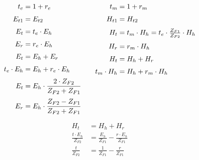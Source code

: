 \vspace{0.2cm}
\begin{equation*}
	\setlength{\jot}{6pt}
	\begin{aligned}[t]
		t_e            & = 1+ r_e                                           \\
		E_{t1}         & =E_{t2}                                            \\
		E_t            & = t_e \cdot E_h                                    \\
		E_r            & = r_e \cdot E_h                                    \\
		E_t            & = E_h + E_r                                        \\
		t_e\cdot E_{h} & = E_{h} + r_e\cdot  E_{h}                          \\
		E_t            & = E_h \cdot \frac{2 \cdot Z_{F2}}{Z_{F2} + Z_{F1}} \\
		E_r            & = E_h \cdot \frac{Z_{F2}-Z_{F1}}{Z_{F2}+Z_{F1}}
	\end{aligned}
	\qquad
	\begin{aligned}[t]
		t_m            & = 1+ r_m                                                      \\
		H_{t1}         & = H_{t2}                                                      \\
		H_t            & = t_m \cdot H_h  = t_e \cdot \tfrac{Z_{F1}}{Z_{F2}} \cdot H_h \\
		H_r            & = r_m \cdot H_h                                               \\
		H_t            & = H_h + H_r                                                   \\
		t_m\cdot H_{h} & = H_{h} + r_m\cdot  H_{h}                                     \\
	\end{aligned}
\end{equation*}

\begin{align*}
	H_t                         & = H_h + H_r                                          \\
	\frac{t\cdot E_{h}}{Z_{F2}} & = \frac{E_{h}}{Z_{F1}} - \frac{r\cdot E_{h}}{Z_{F1}} \\
	\frac{t}{Z_{F2}}            & = \frac{1}{Z_{F1}} - \frac{r}{Z_{F1}}
\end{align*}

